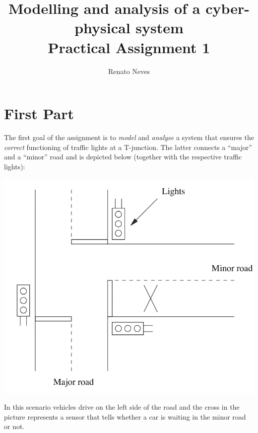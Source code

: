 \documentclass[11pt]{article}
\date{}
\theoremstyle{myplain}
\theoremstyle{definition} %
\begin{document}
 
 
\title{Modelling and analysis of a cyber-physical system \\\small{Practical Assignment 1}}
\author{Renato Neves}
 
\maketitle

\section*{First Part}
The first goal of the assignment is to \emph{model} and
\emph{analyse} a system that ensures the \emph{correct} functioning of
traffic lights at a T-junction. The latter connects a ``major'' and a
``minor'' road and is depicted below (together with the respective
traffic lights):
\begin{center}
\includegraphics[scale=0.3]{images/tjunction.png}
\end{center}
In this scenario vehicles drive on the left side of the road
and the cross in the picture represents a sensor that tells
whether a car is waiting in the minor road or not.
\end{document}
